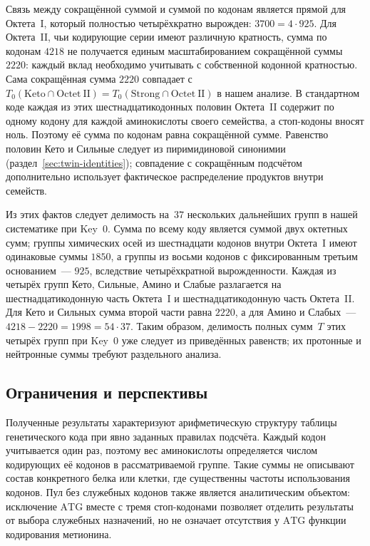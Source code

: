 \documentclass[11pt,a4paper]{article}
\renewcommand{\_}{\origunderscore\allowbreak}
\begin{document}
Связь между сокращённой суммой и суммой по
кодонам является прямой для
Октета~I, который полностью
четырёхкратно вырожден:
$3700 = 4 \cdot 925$. Для
Октета~II, чьи кодирующие серии имеют
различную кратность,
сумма по кодонам $4218$ не получается единым
масштабированием сокращённой суммы $2220$:
каждый вклад необходимо учитывать с собственной
кодонной кратностью. Сама сокращённая сумма
$2220$ совпадает с
$T_{0}(\mathrm{Keto} \cap
\mathrm{Octet~II}) = T_{0}(\mathrm{Strong} \cap
\mathrm{Octet~II})$ в нашем анализе.
В стандартном коде каждая из этих
шестнадцатикодонных половин Октета~II
содержит по одному кодону для каждой аминокислоты
своего семейства, а стоп-кодоны вносят ноль.
Поэтому её сумма по кодонам равна сокращённой сумме.
Равенство половин Кето и Сильные следует из
пиримидиновой синонимии
(раздел~\ref{sec:twin-identities}); совпадение с
сокращённым подсчётом дополнительно использует
фактическое распределение продуктов внутри семейств.

Из этих фактов следует
делимость на~$37$ нескольких дальнейших групп в
нашей систематике при Key~0. Сумма по всему коду является
суммой двух октетных сумм; группы химических осей
из шестнадцати кодонов внутри
Октета~I имеют одинаковые суммы $1850$, а группы
из восьми кодонов с фиксированным третьим основанием~---
$925$, вследствие четырёхкратной вырожденности.
Каждая из четырёх групп Кето,
Сильные, Амино и Слабые
разлагается на шестнадцатикодонную часть
Октета~I и шестнадцатикодонную
часть Октета~II. Для Кето и Сильных сумма
второй части равна $2220$, а для Амино и Слабых~---
$4218-2220=1998=54\cdot37$.
Таким образом, делимость полных сумм~$T$ этих четырёх
групп при Key~0 уже следует из приведённых равенств;
их протонные и нейтронные суммы требуют раздельного анализа.

\subsection{Ограничения и перспективы}
\label{sec:discussion-limitations}

Полученные результаты характеризуют арифметическую структуру
таблицы генетического кода при явно заданных правилах подсчёта.
Каждый кодон учитывается один раз, поэтому вес аминокислоты
определяется числом кодирующих её кодонов в рассматриваемой группе.
Такие суммы не описывают состав конкретного белка или клетки,
где существенны частоты использования кодонов. Пул без служебных
кодонов также является аналитическим объектом: исключение
$\mathrm{ATG}$ вместе с тремя стоп-кодонами позволяет отделить
результаты от выбора служебных назначений, но не означает
отсутствия у $\mathrm{ATG}$ функции кодирования метионина.
\end{document}
